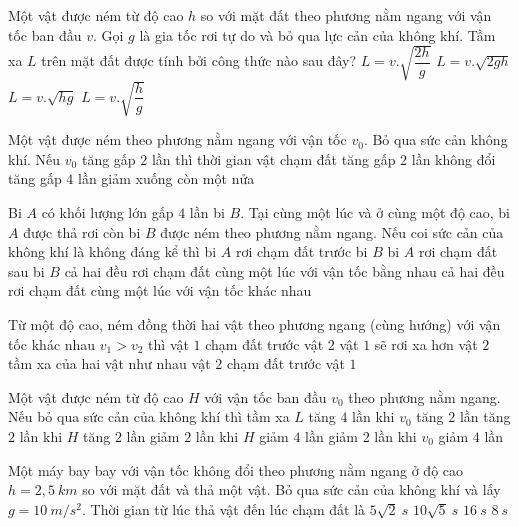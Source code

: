 \begin{ex}%
Một vật được ném từ độ cao $h$ so với mặt đất theo phương nằm ngang với vận tốc ban đầu $v$. Gọi $g$ là gia tốc rơi tự do và bỏ qua lực cản của không khí. Tầm xa $L$ trên mặt đất được tính bởi công thức nào sau đây?
\choice
{\True $L=v.\sqrt{\dfrac{2 h}{g}}$}
{$L=v.\sqrt{2 g h}$}
{$L=v.\sqrt{h g}$}
{$L=v.\sqrt{\dfrac{h}{g}}$}
\loigiai{
}
 \end{ex}
\begin{ex}%
Một vật được ném theo phương nằm ngang với vận tốc $v_0$. Bỏ qua sức cản không khí. Nếu $v_0$ tăng gấp $2$ lần thì thời gian vật chạm đất
\choice
{tăng gấp $2$ lần}
{\True không đổi}
{tăng gấp $4$ lần}
{giảm xuống còn một nửa}
 \end{ex}

\begin{ex}%
Bi $A$ có khối lượng lớn gấp $4$ lần bi $B$. Tại cùng một lúc và ở cùng một độ cao, bi $A$ được thả rơi còn bi $B$ được ném theo phương nằm ngang. Nếu coi sức cản của không khí là không đáng kể thì
\choice
{bi $A$ rơi chạm đất trước bi $B$}
{bi $A$ rơi chạm đất sau bi $B$}
{cả hai đều rơi chạm đất cùng một lúc với vận tốc bằng nhau}
{\True cả hai đều rơi chạm đất cùng một lúc với vận tốc khác nhau}
\end{ex}

\begin{ex}%
Từ một độ cao, ném đồng thời hai vật theo phương ngang (cùng hướng) với vận tốc khác nhau $v_1>v_2$ thì
\choice
{vật $1$ chạm đất trước vật $2$}
{\True vật $1$ sẽ rơi xa hơn vật $2$}
{tầm xa của hai vật như nhau}
{vật $2$ chạm đất trước vật $1$}
 \end{ex}

\begin{ex}%
Một vật được ném từ độ cao $H$ với vận tốc ban đầu $v_0$ theo phương nằm ngang. Nếu bỏ qua sức cản của không khí thì tầm xa $L$
\choice
{tăng $4$ lần khi $v_0$ tăng $2$ lần}
{tăng $2$ lần khi $H$ tăng $2$ lần}
{\True giảm $2$ lần khi $H$ giảm $4$ lần}
{giảm $2$ lần khi $v_0$ giảm $4$ lần}
 \end{ex}



\begin{ex}%
Một máy bay bay với vận tốc không đổi theo phương nằm ngang ở độ cao $h = 2,5\ km$ so với mặt đất và thả một vật. Bỏ qua sức cản của không khí và lấy $g = 10\ m/s^2$. Thời gian từ lúc thả vật đến lúc chạm đất là
\choice
{$5\sqrt 2\ s$}
{\True $10\sqrt 5\ s$}
{$16\ s$}
{$8\ s$}
 \end{ex}

